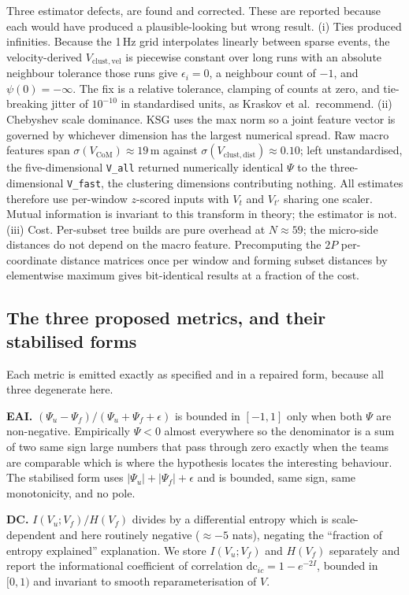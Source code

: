 \documentclass[11pt,a4paper]{article}
\newcommand{\code}[1]{\texttt{\small #1}}
\newcommand{\Vcom}{V_{\mathrm{CoM}}}
\newcommand{\Vcd}{V_{\mathrm{clust,dist}}}
\newcommand{\Vcv}{V_{\mathrm{clust,vel}}}
\begin{document}
Three estimator defects, are found and corrected. These are reported because each
would have produced a plausible-looking but wrong result. (i) Ties produced
infinities. Because the 1\,Hz grid interpolates linearly between sparse events, the
velocity-derived $\Vcv$ is piecewise constant over long runs with an absolute neighbour
tolerance those runs give $\epsilon_i=0$, a neighbour count of $-1$, and $\psi(0)=-\infty$.
The fix is a relative tolerance, clamping of counts at zero, and tie-breaking jitter of
$10^{-10}$ in standardised units, as Kraskov et al.\ recommend. 
(ii) Chebyshev scale
dominance. KSG uses the max norm so a joint feature vector is governed by whichever
dimension has the largest numerical spread. Raw macro features span
$\sigma(\Vcom)\approx19$\,m against $\sigma(\Vcd)\approx0.10$; left unstandardised, the
five-dimensional \code{V\_all} returned numerically identical $\Psi$ to the
three-dimensional \code{V\_fast}, the clustering dimensions contributing nothing. All
estimates therefore use per-window $z$-scored inputs with $V_t$ and $V_{t'}$ sharing one
scaler. Mutual information is invariant to this transform in theory; the estimator is not.
(iii) Cost. Per-subset tree builds are pure overhead at $N\approx59$; the micro-side
distances do not depend on the macro feature. Precomputing the $2P$ per-coordinate distance
matrices once per window and forming subset distances by elementwise maximum gives
bit-identical results at a fraction of the cost.

\subsection{The three proposed metrics, and their stabilised forms}
\label{sec:metrics}

Each metric is emitted exactly as specified and in a repaired form, because all
three degenerate here.

\textbf{EAI.} $(\Psi_u-\Psi_f)/(\Psi_u+\Psi_f+\epsilon)$ is bounded in $[-1,1]$ only when
both $\Psi$ are non-negative. Empirically $\Psi<0$ almost everywhere so the denominator is
a sum of two same sign large numbers that pass through zero exactly when the teams are
comparable which is where the hypothesis locates the interesting behaviour. The
stabilised form uses $|\Psi_u|+|\Psi_f|+\epsilon$ and is bounded, same sign, same monotonicity,
and no pole.

\textbf{DC.} $I(V_u;V_f)/H(V_f)$ divides by a differential entropy which is
scale-dependent and here routinely negative ($\approx-5$ nats), negating the ``fraction of entropy explained'' explanation. 
We store $I(V_u;V_f)$ and
$H(V_f)$ separately and report the informational coefficient of correlation
$\mathrm{dc}_{ic}=1-e^{-2I}$, bounded in $[0,1)$ and invariant to smooth
reparameterisation of $V$.
\end{document}
